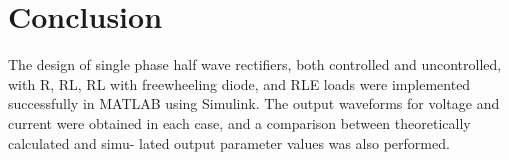 \section{Conclusion}
\hspace{\parindent}
The design of single phase half wave rectifiers, both controlled and
uncontrolled, with R, RL, RL with freewheeling diode, and RLE
loads were implemented successfully in MATLAB using Simulink.
The output waveforms for voltage and current were obtained in each
case, and a comparison between theoretically calculated and simu-
lated output parameter values was also performed.

\pagebreak
